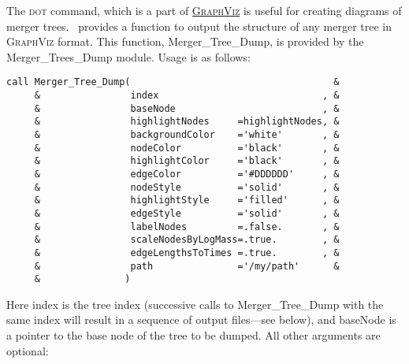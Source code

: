 The {\normalfont \scshape dot} command, which is a part of \href{http://www.graphviz.org/}{{\normalfont \scshape GraphViz}} is useful for creating diagrams of merger trees. \glc\ provides a function to output the structure of any merger tree in {\normalfont \scshape GraphViz} format. This function, {\normalfont \ttfamily Merger\_Tree\_Dump}, is provided by the {\normalfont \ttfamily Merger\_Trees\_Dump} module. Usage is as follows:
\begin{lstlisting}[escapechar=@,breaklines,prebreak=\&,postbreak=\&]
call Merger_Tree_Dump(                                    &
     &                index                             , &
     &                baseNode                          , &
     &                highlightNodes     =highlightNodes, &
     &                backgroundColor    ='white'       , &
     &                nodeColor          ='black'       , &
     &                highlightColor     ='black'       , &
     &                edgeColor          ='#DDDDDD'     , &
     &                nodeStyle          ='solid'       , &
     &                highlightStyle     ='filled'      , &
     &                edgeStyle          ='solid'       , &
     &                labelNodes         =.false.       , &
     &                scaleNodesByLogMass=.true.        , &
     &                edgeLengthsToTimes =.true.        , &
     &                path               ='/my/path'      &
     &               )
\end{lstlisting}
Here {\normalfont \ttfamily index} is the tree index (successive calls to {\normalfont \ttfamily Merger\_Tree\_Dump} with the same index will result in a sequence of output files---see below), and {\normalfont \ttfamily baseNode} is a pointer to the base node of the tree to be dumped. All other arguments are optional:
